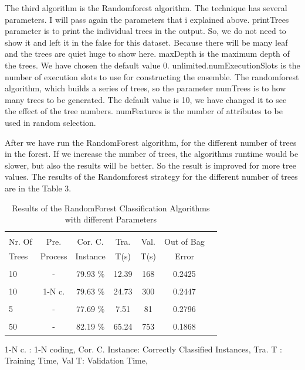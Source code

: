 \documentclass[a4paper]{article}
\begin{document}
The third algorithm is the Randomforest algorithm. The technique has several
parameters. I will pass again the parameters that i explained above. printTrees
parameter is to print the individual trees in the output. So, we do not need to
show it and left it in the false for this dataset. Because there will be many
leaf and the trees are quiet huge to show here. maxDepth is the maximum depth
of the trees. We have chosen the default value 0. unlimited.numExecutionSlots
is the number of execution slots to use for constructing the ensemble. The
randomforest algorithm, which builds a series of trees, so the parameter
numTrees is to how many trees to be generated. The default value is 10, we have
changed it to see the effect of the tree numbers. numFeatures is the number of
attributes to be used in random selection. 

After we have run the RandomForest algorithm, for the different number of trees
in the forest. If we increase the number of trees, the algorithms runtime would
be slower, but also the results will be better. So the result is improved for
more tree values. The results of the  Randomforest  strategy for the different
number of trees are in the Table 3.

\begin{table}
\begin{tabular}{|l| c | c | c | c |c |c |}

\hline & & & & & \\
Nr. Of & Pre. & Cor. C.& Tra. & Val. & Out of Bag  \\
Trees & Process & Instance & T(s) &  T(s) & Error  \\
\hline & & & & & \\
10	 & - &			79.93  $\%$ & 12.39 & 168 & 0.2425  \\ 
\hline & & & & & \\
10 	 & 1-N c. &	79.63 $\%$ & 24.73 & 300 & 0.2447  \\ 
\hline & & & & & \\
5 	& - &			77.69 $\%$ & 7.51 & 81 & 0.2796   \\ 
\hline & & & & &  \\
50 	 & - &			82.19  $\%$ & 65.24 & 753 &  0.1868 \\ 
\hline
\end{tabular}
\caption{Results of the RandomForest Classification Algorithms with different Parameters}
	1-N c. : 1-N coding,
	Cor. C. Instance:  Correctly Classified Instances,
	Tra. T : Training Time,
	Val T: Validation Time,
\end{table}
\end{document}
